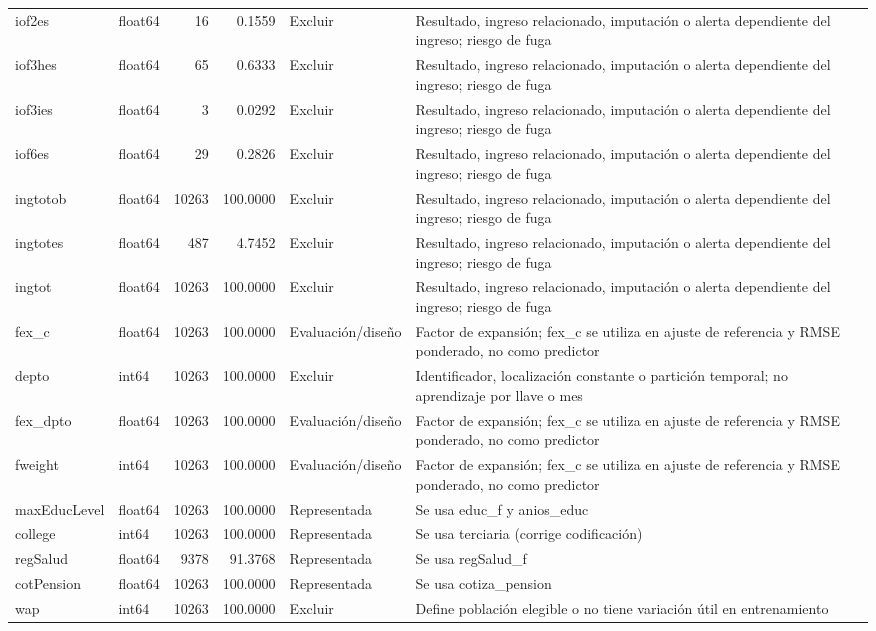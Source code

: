 \begin{longtable}{llrrll}
iof2es & float64 & 16 & 0.1559 & Excluir & Resultado, ingreso relacionado, imputación o alerta dependiente del ingreso; riesgo de fuga \\
iof3hes & float64 & 65 & 0.6333 & Excluir & Resultado, ingreso relacionado, imputación o alerta dependiente del ingreso; riesgo de fuga \\
iof3ies & float64 & 3 & 0.0292 & Excluir & Resultado, ingreso relacionado, imputación o alerta dependiente del ingreso; riesgo de fuga \\
iof6es & float64 & 29 & 0.2826 & Excluir & Resultado, ingreso relacionado, imputación o alerta dependiente del ingreso; riesgo de fuga \\
ingtotob & float64 & 10263 & 100.0000 & Excluir & Resultado, ingreso relacionado, imputación o alerta dependiente del ingreso; riesgo de fuga \\
ingtotes & float64 & 487 & 4.7452 & Excluir & Resultado, ingreso relacionado, imputación o alerta dependiente del ingreso; riesgo de fuga \\
ingtot & float64 & 10263 & 100.0000 & Excluir & Resultado, ingreso relacionado, imputación o alerta dependiente del ingreso; riesgo de fuga \\
fex\_c & float64 & 10263 & 100.0000 & Evaluación/diseño & Factor de expansión; fex\_c se utiliza en ajuste de referencia y RMSE ponderado, no como predictor \\
depto & int64 & 10263 & 100.0000 & Excluir & Identificador, localización constante o partición temporal; no aprendizaje por llave o mes \\
fex\_dpto & float64 & 10263 & 100.0000 & Evaluación/diseño & Factor de expansión; fex\_c se utiliza en ajuste de referencia y RMSE ponderado, no como predictor \\
fweight & int64 & 10263 & 100.0000 & Evaluación/diseño & Factor de expansión; fex\_c se utiliza en ajuste de referencia y RMSE ponderado, no como predictor \\
maxEducLevel & float64 & 10263 & 100.0000 & Representada & Se usa educ\_f y anios\_educ \\
college & int64 & 10263 & 100.0000 & Representada & Se usa terciaria (corrige codificación) \\
regSalud & float64 & 9378 & 91.3768 & Representada & Se usa regSalud\_f \\
cotPension & float64 & 10263 & 100.0000 & Representada & Se usa cotiza\_pension \\
wap & int64 & 10263 & 100.0000 & Excluir & Define población elegible o no tiene variación útil en entrenamiento \\

\end{longtable}
